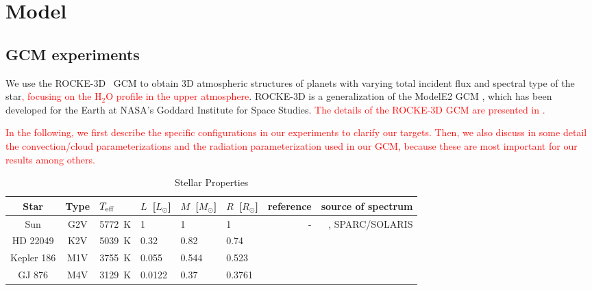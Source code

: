 \documentclass[11pt,numberedappendix,twocolappendix,]{emulateapj}
\def\water{H$_2$O}
\def\modelE{ROCKE-3D}
\def\addYF#1{\textcolor{red}{#1}}
\begin{document}
\section{Model}
\label{s:model}

\subsection{GCM experiments}

We use the \modelE{} \ GCM \citep{Way2017} to obtain 3D atmospheric structures of planets with varying total incident flux and spectral type of the star\addYF{, focusing on the \water{} profile in the upper atmosphere}. 
\modelE{} is a generalization of the ModelE2 GCM \citep{Schmidt2014}, which has been developed for the Earth at NASA's Goddard Institute for Space Studies. 
%
\addYF{The details of the ROCKE-3D GCM are presented in \citet{Way2017}.}

\addYF{In the following, we first describe the specific configurations in our experiments to clarify our targets. Then, we also discuss in some detail the convection/cloud parameterizations and the radiation parameterization used in our GCM, because these are most important for our results among others. }
%



\begin{table}[!btp]
\caption{Stellar Properties}
\begin{center}
\begin{tabular}{ccllllrr} \hline \hline
%
Star & Type & $T_{\rm eff}$ & $L$~[$L_{\odot}$] & $M$~[$M_{\odot}$] & $R$~[$R_{\odot}$] & reference & source of spectrum \\ \hline
%
Sun & G2V & 5772~K & 1 & 1 & 1 & - & \citet{Lean2005}, SPARC/SOLARIS\footnotemark[1] \\ 
%
HD 22049 & K2V & 5039~K & 0.32 & 0.82 & 0.74 & \citet{Baines2012} & \citet{Segura2003} \\
%
Kepler 186 & M1V & 3755~K & 0.055 & 0.544 & 0.523 & \citet{Torres2015} & \citet{Allard2012} \\
%
GJ 876 & M4V & 3129~K & 0.0122 & 0.37 & 0.3761 & \citet{vonBraun2014} & \citet{Domagal-Goldman2014} \\ \hline
\end{tabular}
\end{center}
\label{tbl:stellar_properties}
\end{table}%
\end{document}
